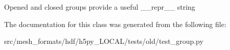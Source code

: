 \begin{DoxyVerb}Opened and closed groups provide a useful __repr__ string \end{DoxyVerb}
 

The documentation for this class was generated from the following file\+:\begin{DoxyCompactItemize}
\item 
src/mesh\+\_\+formats/hdf/h5py\+\_\+\+L\+O\+C\+A\+L/tests/old/test\+\_\+group.\+py\end{DoxyCompactItemize}
